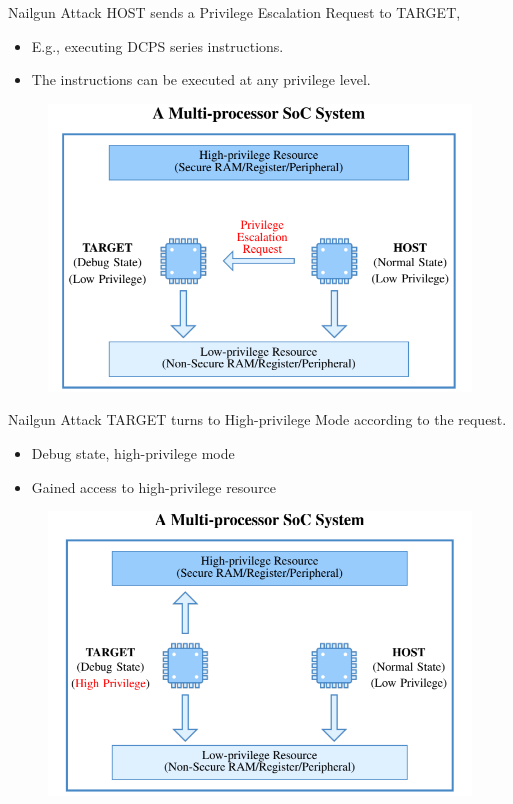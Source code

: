 \documentclass{beamer}
\begin{document}
\begin{frame}{Nailgun Attack}
    HOST sends a Privilege Escalation Request to TARGET,
\begin{itemize}
    \item E.g., executing DCPS series instructions.
    \item The instructions can be executed at any privilege level.
\end{itemize}
    \begin{figure}
        \centering
        \includegraphics[scale=.40]{SUSTech-Beamer-Theme/pic/Nailgun7.png}
        \label{fig:my_label}
    \end{figure}
\end{frame}

\begin{frame}{Nailgun Attack}
    TARGET turns to High-privilege Mode according to the request.
    \begin{itemize}
        \item Debug state, high-privilege mode
        \item Gained access to high-privilege resource
    \end{itemize}
    \begin{figure}
        \centering
        \includegraphics[scale=.40]{SUSTech-Beamer-Theme/pic/Nailgun8.png}
        \label{fig:my_label}
    \end{figure}
\end{frame}
\end{document}
